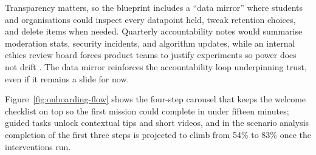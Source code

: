 Transparency matters, so the blueprint includes a ``data mirror'' where students and organisations could inspect every datapoint held, tweak retention choices, and delete items when needed. Quarterly accountability notes would summarise moderation stats, security incidents, and algorithm updates, while an internal ethics review board forces product teams to justify experiments so power does not drift \citep{Choudary2016,Lecture10}. The data mirror reinforces the accountability loop underpinning trust, even if it remains a slide for now.

Figure~\ref{fig:onboarding-flow} shows the four-step carousel that keeps the welcome checklist on top so the first mission could complete in under fifteen minutes; guided tasks unlock contextual tips and short videos, and in the scenario analysis completion of the first three steps is projected to climb from 54\% to 83\% once the interventions run.

